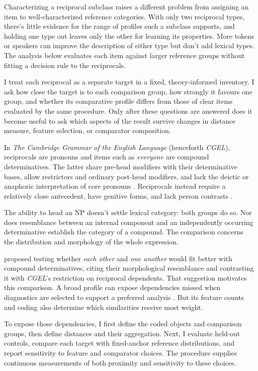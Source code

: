 \documentclass[12pt]{article}
\providecommand{\mention}[1]{\textit{#1}}
\begin{document}
Characterizing a reciprocal subclass raises a different problem from assigning an item to well-characterized reference categories. With only two reciprocal types, there's little evidence for the range of profiles such a subclass supports, and holding one type out leaves only the other for learning its properties. More tokens or speakers can improve the description of either type but don't add lexical types. The analysis below evaluates each item against larger reference groups without fitting a decision rule to the reciprocals.

I treat each reciprocal as a separate target in a fixed, theory-informed inventory. I ask how close the target is to each comparison group, how strongly it favours one group, and whether its comparative profile differs from those of clear items evaluated by the same procedure. Only after these questions are answered does it become useful to ask which aspects of the result survive changes in distance measure, feature selection, or comparator composition.

In \textit{The Cambridge Grammar of the English Language} (henceforth \textit{CGEL}), reciprocals are pronouns and items such as \mention{everyone} are compound determinatives. The latter share pre-head modifiers with their determinative bases, allow restrictors and ordinary post-head modifiers, and lack the deictic or anaphoric interpretation of core pronouns \citep[Ch.~5, \S9.6]{huddleston2002}. Reciprocals instead require a relatively close antecedent, have genitive forms, and lack person contrasts \citep[Ch.~5, \S10.1.2]{huddleston2002}.

The ability to head an NP doesn't settle lexical category: both groups do so. Nor does resemblance between an internal component and an independently occurring determinative establish the category of a compound. The comparison concerns the distribution and morphology of the whole expression.

\textcite[\S4]{reynolds2021} proposed testing whether \mention{each other} and \mention{one another} would fit better with compound determinatives, citing their morphological resemblance and contrasting it with \textit{CGEL}'s restriction on reciprocal dependents. That suggestion motivates this comparison. A broad profile can expose dependencies missed when diagnostics are selected to support a preferred analysis \citep{croft2001}. But its feature counts and coding also determine which similarities receive most weight.

To expose those dependencies, I first define the coded objects and comparison groups, then define distances and their aggregation. Next, I evaluate held-out controls, compare each target with fixed-anchor reference distributions, and report sensitivity to feature and comparator choices. The procedure supplies continuous measurements of both proximity and sensitivity to these choices.
\end{document}
